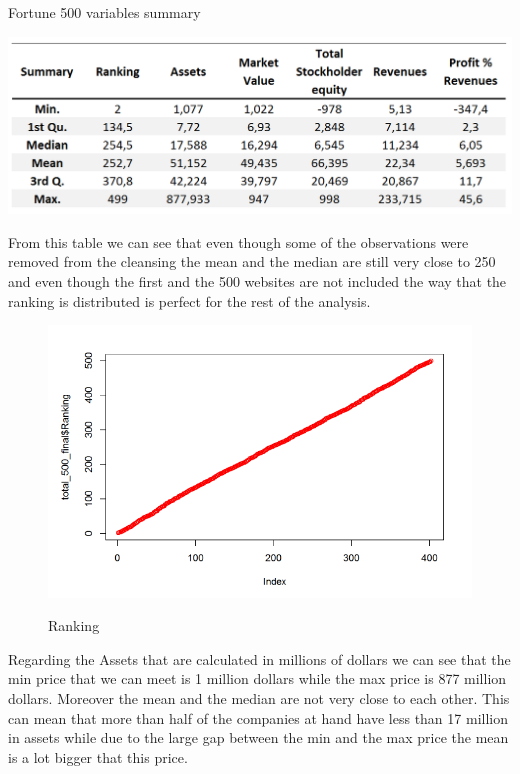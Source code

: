 \documentclass{book}
\begin{document}
\begin{table}[H]
\centering
\caption{Fortune 500 variables summary}
\includegraphics[scale=0.4]{../R/photos/01_summary.PNG} 
\end{table}

From this table we can see that even though some of the observations were removed from the cleansing the mean and the median are still very close to 250 and even though the first and the 500 websites are not included the way that the ranking is distributed is perfect for the rest of the analysis.\\
\begin{figure}[H]
\centering
\caption{Ranking}
\begin{center}
\includegraphics[scale=0.35]{../R/photos/4_2_ranking.png}  \\
\end{center}
\end{figure}
Regarding the Assets that are calculated in millions of dollars we can see that the min price that we can meet is 1 million dollars while the max price is 877 million dollars. Moreover the mean and the median are not very close to each other. This can mean that more than half of the companies at hand have less than 17 million in assets while due to the large gap between the min and the max price the mean is a lot bigger that this price.\\
\end{document}
